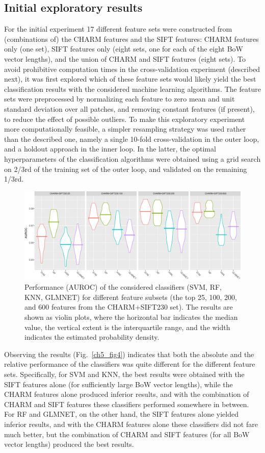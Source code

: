 \subsection{Initial exploratory results}
\label{subsec:initialExploratoryExperiments}
For the initial experiment 17 different feature sets were constructed from (combinations of) the CHARM features and the SIFT features: CHARM features only (one set), SIFT features only (eight sets, one for each of the eight BoW vector lengths), and the union of CHARM and SIFT features (eight sets). To avoid prohibitive computation times in the cross-validation experiment (described next), it was first explored which of these feature sets would likely yield the best classification results with the considered machine learning algorithms. The feature sets were preprocessed by normalizing each feature to zero mean and unit standard deviation over all patches, and removing constant features (if present), to reduce the effect of possible outliers. To make this exploratory experiment more computationally feasible, a simpler resampling strategy was used rather than the described one, namely a single 10-fold cross-validation in the outer loop, and a holdout approach in the inner loop. In the latter, the optimal hyperparameters of the classification algorithms were obtained using a grid search on 2/3rd of the training set of the outer loop, and validated on the remaining 1/3rd.
\begin{figure}[ht]
	\centering
	\includegraphics[width=\textwidth]{fig06}
	\caption{Performance (AUROC) of the considered classifiers (SVM, RF, KNN, GLMNET) for different feature subsets (the top 25, 100, 200, and 600 features from the CHARM+SIFT230 set). The results are shown as violin plots, where the horizontal bar indicates the median value, the vertical extent is the interquartile range, and the width indicates the estimated probability density.}
	\label{ch5_fig6}
\end{figure}
Observing the results (Fig.~\ref{ch5_fig4}) indicates that both the absolute and the relative performance of the classifiers was quite different for the different feature sets. Specifically, for SVM and KNN, the best results were obtained with the SIFT features alone (for sufficiently large BoW vector lengths), while the CHARM features alone produced inferior results, and with the combination of CHARM and SIFT features these classifiers performed somewhere in between. For RF and GLMNET, on the other hand, the SIFT features alone yielded inferior results, and with the CHARM features alone these classifiers did not fare much better, but the combination of CHARM and SIFT features (for all BoW vector lengths) produced the best results.

